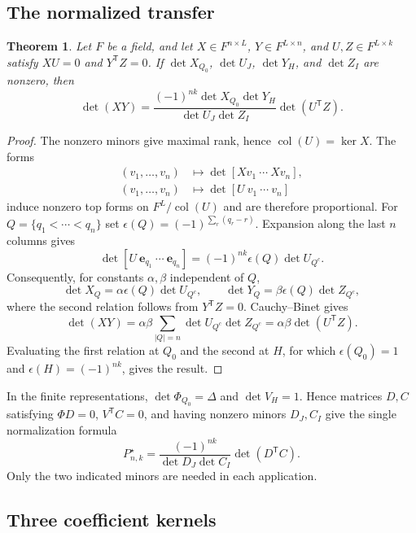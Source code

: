 \documentclass[12pt]{article}
\newtheorem{theorem}{Theorem}[section]
\numberwithin{equation}{section}
\newcommand{\eb}{\mathbf e}
\begin{document}
\subsection{The normalized transfer}

\begin{theorem}
Let $F$ be a field, and let $X\in F^{n\times L}$,
$Y\in F^{L\times n}$, and $U,Z\in F^{L\times k}$ satisfy $XU=0$ and $Y^{\mathsf T}Z=0$.
If $\det X_{Q_0}$, $\det U_J$, $\det Y_H$, and $\det Z_I$ are
nonzero, then
\[
 \det(XY)=
 \frac{(-1)^{nk}\det X_{Q_0}\det Y_H}
      {\det U_J\det Z_I}\det(U^{\mathsf T}Z).
\]
\end{theorem}

\begin{proof}
The nonzero minors give maximal rank, hence
$\operatorname{col}(U)=\ker X$.  The forms
\[
\begin{aligned}
 (v_1,\ldots,v_n)&\longmapsto\det[Xv_1\ \cdots\ Xv_n],\\
 (v_1,\ldots,v_n)&\longmapsto\det[U\ v_1\ \cdots\ v_n]
\end{aligned}
\]
induce nonzero top forms on $F^L/\operatorname{col}(U)$ and are
therefore proportional.  For $Q=\{q_1<\cdots<q_n\}$ set
$\epsilon(Q)=(-1)^{\sum_r(q_r-r)}$.  Expansion along the last $n$
columns gives
\[
 \det[U\ \eb_{q_1}\ \cdots\ \eb_{q_n}]
 =(-1)^{nk}\epsilon(Q)\det U_{Q^c}.
\]
Consequently, for constants $\alpha,\beta$ independent of $Q$,
\[
 \det X_Q=\alpha\epsilon(Q)\det U_{Q^c},\qquad
 \det Y_Q=\beta\epsilon(Q)\det Z_{Q^c},
\]
where the second relation follows from $Y^{\mathsf T}Z=0$.
Cauchy--Binet gives
\[
 \det(XY)=\alpha\beta
 \sum_{|Q|=n}\det U_{Q^c}\det Z_{Q^c}
 =\alpha\beta\det(U^{\mathsf T}Z).
\]
Evaluating the first relation at $Q_0$ and the second at $H$, for
which $\epsilon(Q_0)=1$ and $\epsilon(H)=(-1)^{nk}$, gives the result.
\end{proof}

In the finite representations, $\det\Phi_{Q_0}=\Delta$ and
$\det V_H=1$.  Hence matrices $D,C$ satisfying
$\Phi D=0$, $V^{\mathsf T}C=0$, and having nonzero minors $D_J,C_I$
give the single normalization formula
\begin{equation}\label{eq:normalized-transfer}
 P^\star_{n,k}
 =\frac{(-1)^{nk}}{\det D_J\det C_I}
   \det(D^{\mathsf T}C).
\end{equation}
Only the two indicated minors are needed in each application.

\subsection{Three coefficient kernels}
\end{document}
